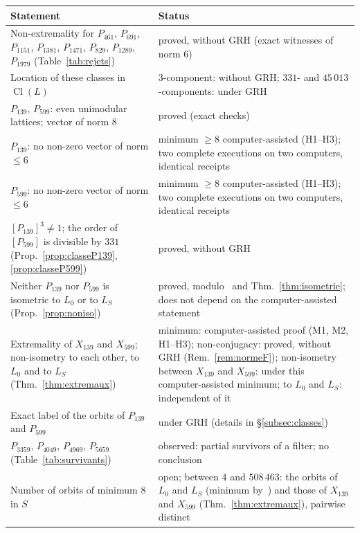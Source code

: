 \documentclass[11pt,a4paper]{amsart}
\theoremstyle{plain}
\theoremstyle{definition}
\numberwithin{equation}{section}
\DeclareMathOperator{\Cl}{Cl}
\newcommand{\Lz}{L_{0}}
\newcommand{\LS}{L_{S}}
\begin{document}
\begin{center}
\medskip
\begin{tabular}{>{\raggedright\arraybackslash}p{7.3cm}>{\raggedright\arraybackslash}p{6.9cm}}
\toprule
Statement & Status \\
\midrule
Non-extremality for $P_{461}$, $P_{691}$, $P_{1151}$, $P_{1381}$, $P_{1471}$, $P_{829}$, $P_{1289}$, $P_{1979}$ (Table~\ref{tab:rejets}) & proved, without GRH (exact witnesses of norm $6$) \\
Location of these classes in $\Cl(L)$ & $3$-component: without GRH; $331$- and $45\,013$-components: under GRH \\
$P_{139}$, $P_{599}$: even unimodular lattices; vector of norm $8$ & proved (exact checks) \\
$P_{139}$: no non-zero vector of norm $\le6$ & minimum $\ge8$ computer-assisted (H1--H3); two complete executions on two computers, identical receipts \\
$P_{599}$: no non-zero vector of norm $\le6$ & minimum $\ge8$ computer-assisted (H1--H3); two complete executions on two computers, identical receipts \\
$[P_{139}]^3\neq1$; the order of $[P_{599}]$ is divisible by $331$ (Prop.~\ref{prop:classeP139}, \ref{prop:classeP599}) & proved, without GRH \\
Neither $P_{139}$ nor $P_{599}$ is isometric to $\Lz$ or to $\LS$ (Prop.~\ref{prop:noniso}) & proved, modulo~\cite{Sak26} and Thm.~\ref{thm:isometrie}; does not depend on the computer-assisted statement \\
Extremality of $X_{139}$ and $X_{599}$; non-isometry to each other, to $\Lz$ and to $\LS$ (Thm.~\ref{thm:extremaux}) & minimum: computer-assisted proof (M1, M2, H1--H3); non-conjugacy: proved, without GRH (Rem.~\ref{rem:normeF}); non-isometry between $X_{139}$ and $X_{599}$: under this computer-assisted minimum; to $\Lz$ and $\LS$: independent of it \\
Exact label of the orbits of $P_{139}$ and $P_{599}$ & under GRH (details in \S\ref{subsec:classes}) \\
$P_{3359}$, $P_{4049}$, $P_{4969}$, $P_{5659}$ (Table~\ref{tab:survivants}) & observed: partial survivors of a filter; no conclusion \\
Number of orbits of minimum $8$ in $S$ & open; between $4$ and $508\,463$: the orbits of $\Lz$ and $\LS$ (minimum by~\cite{Sak26}) and those of $X_{139}$ and $X_{599}$ (Thm.~\ref{thm:extremaux}), pairwise distinct \\
\bottomrule
\end{tabular}
\end{center}
\end{document}
